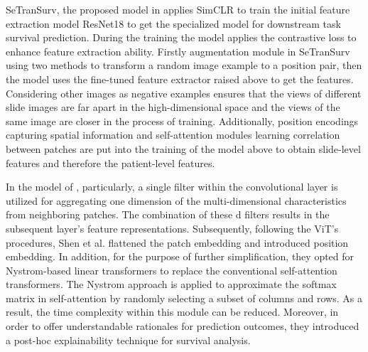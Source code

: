 \documentclass[journal,twoside,web]{ieeecolor}
\begin{document}
SeTranSurv, the proposed model in \cite{huang2021integration} applies SimCLR to train the initial feature extraction model ResNet18\cite{he2016deep} to get the specialized model for downstream task survival prediction.
During the training the model applies the contrastive loss\cite{he2020momentum} to enhance feature extraction ability.
Firstly augmentation module in SeTranSurv using two methods to transform a random image example to a position pair, then the model uses the fine-tuned feature extractor raised above to get the features. 
Considering other images as negative examples ensures that the views of different slide images are far apart in the high-dimensional space and the views of the same image are closer in the process of training.
Additionally, position encodings capturing spatial information and self-attention modules learning correlation between patches are put into the training of the model above to obtain slide-level features and therefore the patient-level features.

In the model of \cite{shen2022explainable}, particularly, a single filter within the convolutional layer is utilized for aggregating one dimension of the multi-dimensional characteristics from neighboring patches. 
The combination of these d filters results in the subsequent layer's feature representations.
Subsequently, following the ViT's procedures, Shen et al. flattened the patch embedding and introduced position embedding. 
In addition, for the purpose of further simplification, they opted for Nystrom-based linear transformers\cite{verma2021beyond} to replace the conventional self-attention transformers. 
The Nystrom approach is applied to approximate the softmax matrix in self-attention by randomly selecting a subset of columns and rows. 
As a result, the time complexity within this module can be reduced.
Moreover, in order to offer understandable rationales for prediction outcomes, they introduced a post-hoc explainability technique for survival analysis.
\end{document}
